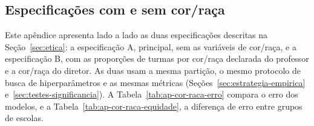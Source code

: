 \begin{apendicesenv}

\partapendices

\chapter{Especificações com e sem cor/raça}
\label{ap:cor-raca}

Este apêndice apresenta lado a lado as duas especificações descritas na
Seção~\ref{sec:etica}: a especificação A, principal, sem as variáveis de
cor/raça, e a especificação B, com as proporções de turmas por cor/raça
declarada do professor e a cor/raça do diretor. As duas usam a mesma
partição, o mesmo protocolo de busca de hiperparâmetros e as mesmas
métricas (Seções~\ref{sec:estrategia-empirica}
e~\ref{sec:testes-significancia}). A Tabela~\ref{tab:ap-cor-raca-erro}
compara o erro dos modelos, e a Tabela~\ref{tab:ap-cor-raca-equidade}, a
diferença de erro entre grupos de escolas.


\end{apendicesenv}
